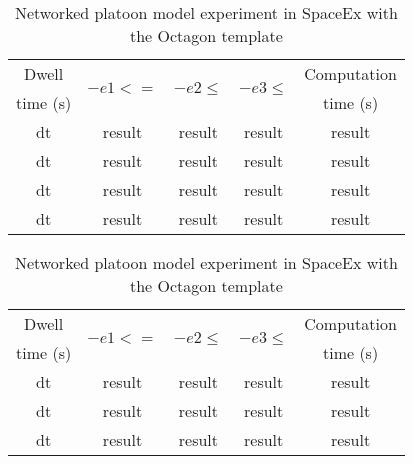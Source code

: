 %
\begin{table}
\begin{minipage}{0.45\textwidth}
\begin{tabular}{|c|c|c|c|c|}
\hline
Dwell & \multirow{2}{*}{$-e1<=$} & \multirow{2}{*}{$-e2\leq$} &
\multirow{2}{*}{$-e3\leq$} & Computation\\
time (s) & & & & time (s)\\
\hline
\multirow{2}{*}{dt} & \multirow{2}{*}{result} &
\multirow{2}{*}{result} & \multirow{2}{*}{result} &
\multirow{2}{*}{result} \\
& & & & \\
\hline
\multirow{2}{*}{dt} & \multirow{2}{*}{result} &
\multirow{2}{*}{result} & \multirow{2}{*}{result} &
\multirow{2}{*}{result} \\
& & & & \\
\hline
\multirow{2}{*}{dt} & \multirow{2}{*}{result} &
\multirow{2}{*}{result} & \multirow{2}{*}{result} &
\multirow{2}{*}{result} \\
& & & & \\
\hline
\multirow{2}{*}{dt} & \multirow{2}{*}{result} &
\multirow{2}{*}{result} & \multirow{2}{*}{result} &
\multirow{2}{*}{result} \\
& & & & \\
\hline
\end{tabular}
\caption{Networked platoon model experiment in SpaceEx with the Octagon template}
\end{minipage}
\hspace{3em}
\begin{minipage}{0.45\textwidth}
\begin{tabular}{|c|c|c|c|c|}
\hline
Dwell & \multirow{2}{*}{$-e1<=$} & \multirow{2}{*}{$-e2\leq$} &
\multirow{2}{*}{$-e3\leq$} & Computation\\
time (s) & & & & time (s)\\
\hline
\multirow{2}{*}{dt} & \multirow{2}{*}{result} &
\multirow{2}{*}{result} & \multirow{2}{*}{result} &
\multirow{2}{*}{result} \\
& & & & \\
\hline
\multirow{2}{*}{dt} & \multirow{2}{*}{result} &
\multirow{2}{*}{result} & \multirow{2}{*}{result} &
\multirow{2}{*}{result} \\
& & & & \\
\hline
\multirow{2}{*}{dt} & \multirow{2}{*}{result} &
\multirow{2}{*}{result} & \multirow{2}{*}{result} &
\multirow{2}{*}{result} \\
& & & & \\

\end{tabular}
\end{minipage}
\end{table}
